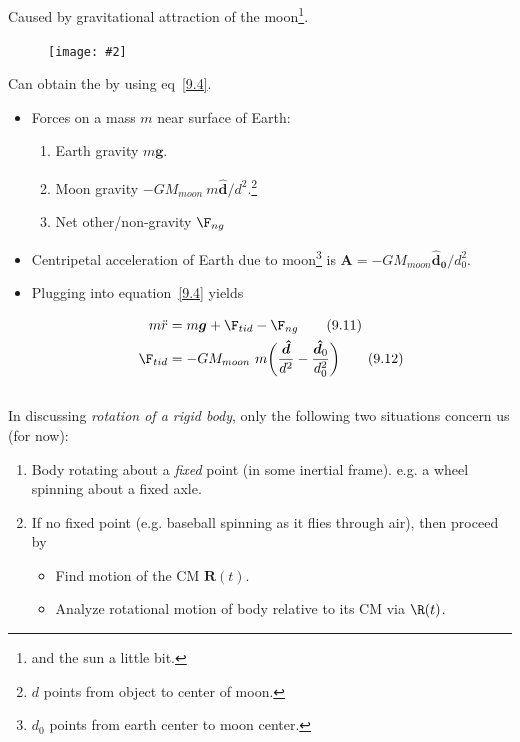 \documentclass[10pt, twocolumn]{article}
\DeclareRobustCommand{\mybox}[2][gray!20]{%
	\begin{tcolorbox}[   %
		breakable,
		left=0pt,
		right=0pt,
		top=-13pt,
		bottom=0pt,
		colback=#1,
		colframe=#1,
		width=0.45\dimexpr\textwidth\relax,
		enlarge left by=0mm,
		boxsep=1pt,
		arc=0pt,outer arc=0pt,
		]
		#2
	\end{tcolorbox}
}
\newcommand\graybox[1]{ \mybox[gray!20]{\begin{align}#1\end{align}} }
\newcommand\myfig[2][0.3\textwidth]{\begin{figure}[h!]\centering\texttt{[image: \#2]}\end{figure}}
\newcommand{\myspace}{\vspace{3\bigskipamount}}
\newcommand\p{\Needspace{10\baselineskip} \noindent}
\newcommand{\rddot}{\ddot{r}}
\newcommand\tlab[1]{\tag{#1}\label{#1}}
\begin{document}
\subsection{}

\p Caused by gravitational attraction of the moon\footnote{and the sun a little bit.}. 
\myfig{Tides.PNG}

\p Can obtain the  by using eq~\ref{9.4}. 
\begin{itemize}
	\item Forces on a mass $m$ near surface of Earth:
	\begin{enumerate}
		\item Earth gravity $m\bm{g}$. 
		\item Moon gravity $-GM_{moon} ~ m \bm{\hat{d}} / d^2$.\footnote{$d$ points from object to center of moon.}
		\item Net other/non-gravity $\F_{ng}$
	\end{enumerate}
	\item Centripetal acceleration of Earth due to moon\footnote{$d_0$ points from earth center to moon center.} is $\bm{A} = -G M_{moon} \bm{\hat{d}_0} / d_0^2$.
	\item Plugging into equation~\ref{9.4} yields
	\graybox{  m\rddot &= m\bm{g} + \F_{tid} -  \F_{ng}  \tlab{9.11} \\ 
		\F_{tid} &= - G M_{moon} ~ m \bigg(\frac{\bm{\hat{d}}}{d^2}  - \frac{\bm{\hat{d}}_0}{d_0^2} \bigg)\tlab{9.12}   }
\end{itemize}
\myspace 

\subsection{}

\p In discussing \textit{rotation of a rigid body}, only the following two situations concern us (for now):
\begin{enumerate}
	\item Body rotating about a \textit{fixed} point (in some inertial frame). e.g. a wheel spinning about a fixed axle. 
	\item If no fixed point (e.g. baseball spinning as it flies through air), then proceed by 
	\begin{itemize}
		\item Find motion of the CM $\bm{R}(t)$. 
		\item Analyze rotational motion of body relative to its CM via $\R(t)$. 
	\end{itemize}
\end{enumerate}
\end{document}
